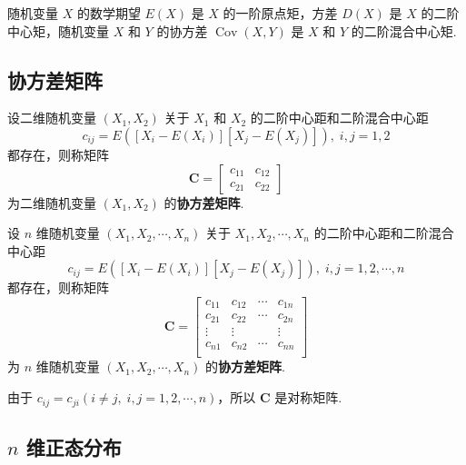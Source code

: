 随机变量 $X$ 的数学期望 $E(X)$ 是 $X$ 的一阶原点矩，方差 $D(X)$ 是 $X$ 的二阶中心矩，随机变量 $X$ 和 $Y$ 的协方差 $\operatorname{Cov}(X,Y)$ 是 $X$ 和 $Y$ 的二阶混合中心矩.

\subsection{协方差矩阵}

\begin{definition}
    设二维随机变量 $(X_1,X_2)$ 关于 $X_1$ 和 $X_2$ 的二阶中心距和二阶混合中心距
    $$
    c_{ij} = E([X_i-E(X_i)][X_j-E(X_j)]), \; i,j=1,2
    $$
    都存在，则称矩阵
    $$
    \boldsymbol{C} = \begin{bmatrix}
        c_{11} & c_{12} \\
        c_{21} & c_{22}
    \end{bmatrix}
    $$
    为二维随机变量 $(X_1,X_2)$ 的\textbf{协方差矩阵}.

    设 $n$ 维随机变量 $(X_1,X_2,\cdots,X_n)$ 关于 $X_1,X_2,\cdots,X_n$ 的二阶中心距和二阶混合中心距
    $$
    c_{ij} = E([X_i-E(X_i)][X_j-E(X_j)]), \; i,j=1,2,\cdots,n
    $$
    都存在，则称矩阵
    $$
    \boldsymbol{C} = \begin{bmatrix}
        c_{11} & c_{12} & \cdots & c_{1n} \\
        c_{21} & c_{22} & \cdots & c_{2n} \\
        \vdots & \vdots & & \vdots \\
        c_{n1} & c_{n2} & \cdots & c_{nn} \\
    \end{bmatrix}
    $$
    为 $n$ 维随机变量 $(X_1,X_2,\cdots,X_n)$ 的\textbf{协方差矩阵}.
\end{definition}

由于 $c_{ij}=c_{ji} (i \not= j, \; i,j=1,2,\cdots,n)$，所以 $\boldsymbol{C}$ 是对称矩阵.

\subsection{\texorpdfstring{$n$}{} 维正态分布}

